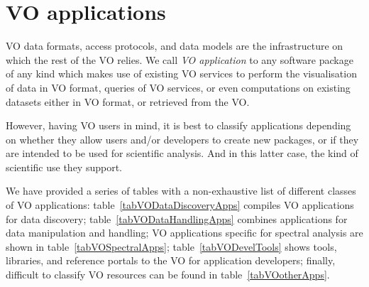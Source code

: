 


	\section{VO applications} %
	\label{sec:vo_applications}

		VO data formats, access protocols, and data models are the
		infrastructure on which the rest of the VO relies. We
		call \emph{VO application} to any software package of any
		kind which makes use of existing VO services to perform
		the visualisation of data in VO format, queries of VO
		services, or even computations on existing datasets either
		in VO format, or retrieved from the VO.
		
		 However, having VO users in mind, it is best to classify
		applications depending on whether they allow users and/or
		developers to create new packages, or if they are intended
		to be used for scientific analysis. And in this latter
		case, the kind of scientific use they support.
		
		 We have provided a series of tables with a non-exhaustive
		list of different classes of VO applications:
		table~\ref{tabVODataDiscoveryApps} compiles VO applications
		for data discovery; table~\ref{tabVODataHandlingApps}
		combines applications for data manipulation and handling;
		VO applications specific for spectral analysis are shown in
		table~\ref{tabVOSpectralApps}; table~\ref{tabVODevelTools}
		shows tools, libraries, and reference portals to the VO for
		application developers; finally, difficult to classify VO
		resources can be found in table~\ref{tabVOotherApps}.
		

